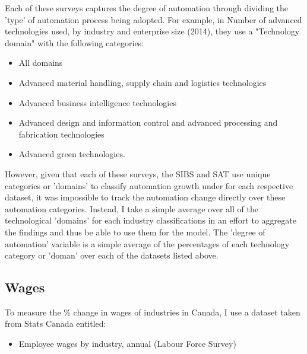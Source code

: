 \documentclass[12pt]{article}
\begin{document}
Each of these surveys captures the degree of automation through dividing the 'type' of automation process being adopted. For example, in Number of advanced technologies used, by industry and enterprise size (2014), they use a "Technology domain" with the following categories: 
\begin{itemize}
\item All domains
\item Advanced material handling, supply chain and logistics technologies
\item Advanced business intelligence technologies
\item Advanced design and information control and advanced processing and fabrication technologies 
\item Advanced green technologies.
\end{itemize}
However, given that each of these surveys, the SIBS and SAT use unique categories or 'domains' to classify automation growth under for each respective dataset, it was impossible to track the automation change directly over these automation categories. Instead, I take a simple average over all of the technological 'domains' for each industry classifications in an effort to aggregate the findings and thus be able to use them for the model. 
\break
\linebreak
The 'degree of automation' variable is a simple average of the percentages of each technology category or 'doman' over each of the datasets listed above.

\newpage

\subsection{Wages}

To measure the \% change in wages of industries in Canada, I use a dataset taken from Stats Canada entitled: 
\begin{itemize}
\item Employee wages by industry, annual (Labour Force Survey)
\end{itemize}
\end{document}
